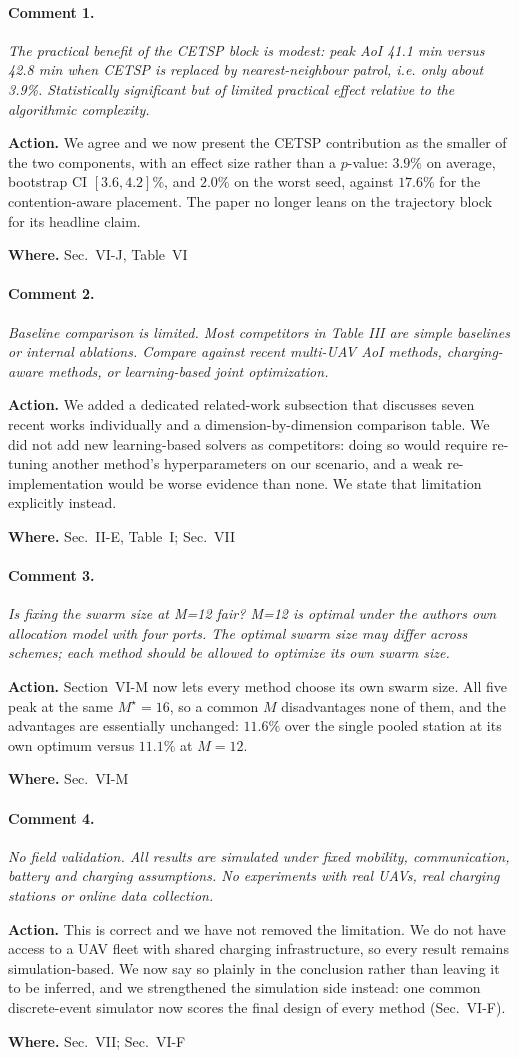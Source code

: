 \documentclass[10pt]{article}
\newcommand{\rev}[1]{\par\medskip\noindent\textit{#1}\par\smallskip}
\newcommand{\act}[2]{\noindent\textbf{Action.} #1\par\noindent\textbf{Where.} #2\par}
\begin{document}
\paragraph{Comment 1.}
\rev{The practical benefit of the CETSP block is modest: peak AoI 41.1 min versus 42.8 min when CETSP is replaced by nearest-neighbour patrol, i.e. only about 3.9\%. Statistically significant but of limited practical effect relative to the algorithmic complexity.}
\act{We agree and we now present the CETSP contribution as the smaller of the two components, with an effect size rather than a $p$-value: $3.9\%$ on average, bootstrap CI $[3.6,4.2]\%$, and $2.0\%$ on the worst seed, against $17.6\%$ for the contention-aware placement. The paper no longer leans on the trajectory block for its headline claim.}{Sec.~VI-J, Table~VI}

\paragraph{Comment 2.}
\rev{Baseline comparison is limited. Most competitors in Table III are simple baselines or internal ablations. Compare against recent multi-UAV AoI methods, charging-aware methods, or learning-based joint optimization.}
\act{We added a dedicated related-work subsection that discusses seven recent works individually and a dimension-by-dimension comparison table. We did not add new learning-based solvers as competitors: doing so would require re-tuning another method's hyperparameters on our scenario, and a weak re-implementation would be worse evidence than none. We state that limitation explicitly instead.}{Sec.~II-E, Table~I; Sec.~VII}

\paragraph{Comment 3.}
\rev{Is fixing the swarm size at M=12 fair? M=12 is optimal under the authors own allocation model with four ports. The optimal swarm size may differ across schemes; each method should be allowed to optimize its own swarm size.}
\act{Section~VI-M now lets every method choose its own swarm size. All five peak at the same $M^\star{=}16$, so a common $M$ disadvantages none of them, and the advantages are essentially unchanged: $11.6\%$ over the single pooled station at its own optimum versus $11.1\%$ at $M{=}12$.}{Sec.~VI-M}

\paragraph{Comment 4.}
\rev{No field validation. All results are simulated under fixed mobility, communication, battery and charging assumptions. No experiments with real UAVs, real charging stations or online data collection.}
\act{This is correct and we have not removed the limitation. We do not have access to a UAV fleet with shared charging infrastructure, so every result remains simulation-based. We now say so plainly in the conclusion rather than leaving it to be inferred, and we strengthened the simulation side instead: one common discrete-event simulator now scores the final design of every method (Sec.~VI-F).}{Sec.~VII; Sec.~VI-F}
\end{document}
